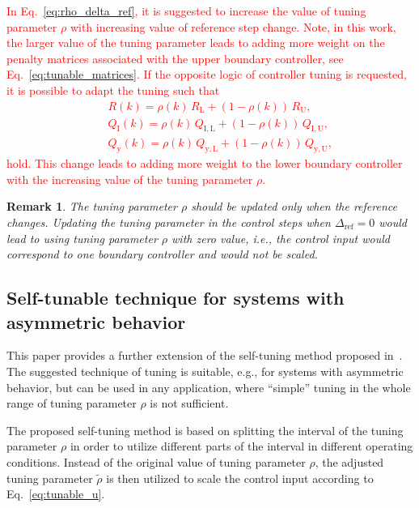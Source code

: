 \documentclass[preprint,12pt]{elsarticle}
\newcommand{\change}[1]{\textcolor{red}{#1}}
\newtheorem{remark}[theorem]{Remark}
\begin{document}
	\change{In Eq.~\eqref{eq:rho_delta_ref}, it is suggested to increase the value of tuning parameter $\rho$ with increasing value of reference step change. Note, in this work, the larger value of the tuning parameter leads to adding more weight on the penalty matrices associated with the upper boundary controller, see Eq.~\eqref{eq:tunable_matrices}. If the opposite logic of controller tuning is requested, it is possible to adapt the tuning such that 
	\begin{eqnarray}
		\label{eq:tunable_R_2}
		&~& R(k) = \rho(k) \, R_\mathrm{L} + (1-\rho(k)) \, R_\mathrm{U}, \\
		\label{eq:tunable_Qx_2}
		&~& Q_\mathrm{I}(k) = \rho(k) \, Q_\mathrm{I,L} + (1-\rho(k)) \, Q_\mathrm{I,U}, \\
		\label{eq:tunable_Qy_2}
		&~& Q_\mathrm{y}(k) = \rho(k) \, Q_\mathrm{y,L} + (1-\rho(k)) \, Q_\mathrm{y,U},
	\end{eqnarray}
	hold. This change leads to adding more weight to the lower boundary controller with the increasing value of the tuning parameter $\rho$.}
	
	\begin{remark}
		The tuning parameter $\rho$ should be updated only when the reference changes. Updating the tuning parameter in the control steps when $\Delta_{\mathrm{ref}} = 0$ would lead to using tuning parameter $\rho$ with zero value, i.e., the control input would correspond to one boundary controller and would not be scaled.
	\end{remark}
	
	
	\subsection{Self-tunable technique for systems with asymmetric behavior}
	\label{sec:self_tunable_rho_scaling}
	
	This paper provides a further extension of the self-tuning method proposed in~\cite{self_tunable}. The suggested technique of tuning is suitable, e.g., for systems with asymmetric behavior, but can be used in any application, where ``simple'' tuning in the whole range of tuning parameter $\rho$ is not sufficient.
	
	The proposed self-tuning method is based on splitting the interval of the tuning parameter $\rho$ in order to utilize different parts of the interval in different operating conditions. Instead of the original value of tuning parameter $\rho$, the adjusted tuning parameter $\widetilde{\rho}$ is then utilized to scale the control input according to Eq.~\eqref{eq:tunable_u}.
	
\end{document}

